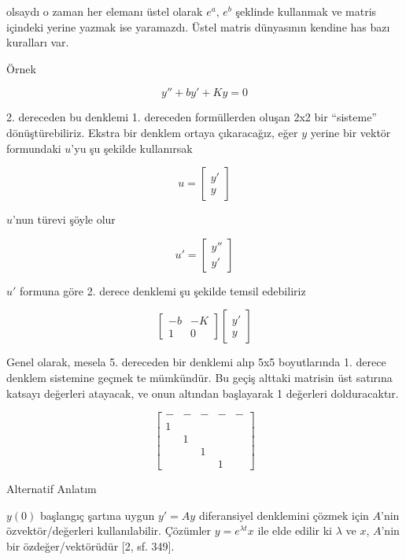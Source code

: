 \documentclass[12pt,fleqn]{article}\usepackage{../../common}
\begin{document}
olsaydı o zaman her elemanı üstel olarak $e^{a}$, $e^b$ şeklinde kullanmak
ve matris içindeki yerine yazmak ise yaramazdı. Üstel matris dünyasının
kendine has bazı kuralları var.

Örnek

$$ y'' + by' + Ky = 0 $$

2. dereceden bu denklemi 1. dereceden formüllerden oluşan 2x2 bir
``sisteme'' dönüştürebiliriz. Ekstra bir denklem ortaya çıkaracağız, eğer
$y$ yerine bir vektör formundaki $u$'yu şu şekilde kullanırsak

$$ u = 
\left[\begin{array}{c}
y' \\ y
\end{array}\right]
 $$

$u$'nun türevi şöyle olur

$$ 
u' = 
\left[\begin{array}{c}
y'' \\ y'
\end{array}\right]
 $$

$u'$ formuna göre 2. derece denklemi şu şekilde temsil edebiliriz

$$ 
\left[\begin{array}{cc}
-b & -K \\
1 & 0
\end{array}\right]
\left[\begin{array}{c}
y' \\ y
\end{array}\right]
 $$

Genel olarak, mesela 5. dereceden bir denklemi alıp 5x5 boyutlarında 1. 
derece denklem sistemine geçmek te mümkündür. Bu geçiş alttaki matrisin 
üst satırına katsayı değerleri atayacak, ve onun altından başlayarak 1 
değerleri dolduracaktır. 

$$ 
\left[\begin{array}{rrrrr}
- & - & - & - & - \\
1 &&&& \\
& 1 &&& \\
&& 1 && \\
&&& 1 & 
\end{array}\right]
 $$

Alternatif Anlatım


$y(0)$ başlangıç şartına uygun $y' = Ay$ diferansiyel denklemini çözmek için
$A$'nin özvektör/değerleri kullanılabilir. Çözümler $y = e^{\lambda t} x$ ile
elde edilir ki $\lambda$ ve $x$, $A$'nin bir özdeğer/vektörüdür [2, sf. 349].
\end{document}
